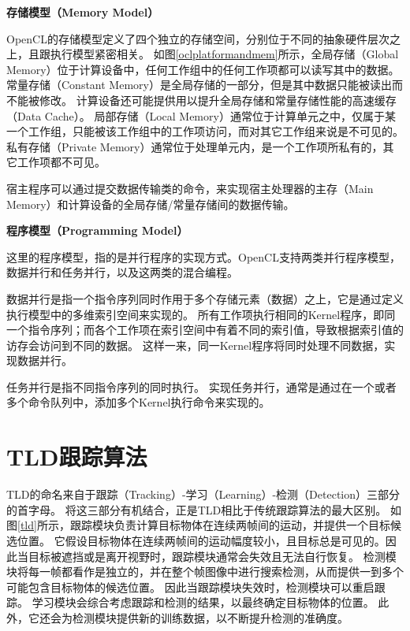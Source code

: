\begin{compactitem}
\item \textbf{存储模型（Memory Model）}
\end{compactitem}

OpenCL的存储模型定义了四个独立的存储空间，分别位于不同的抽象硬件层次之上，且跟执行模型紧密相关。
如图\ref{oclplatformandmem}所示，全局存储（Global Memory）位于计算设备中，任何工作组中的任何工作项都可以读写其中的数据。
常量存储（Constant Memory）是全局存储的一部分，但是其中数据只能被读出而不能被修改。
计算设备还可能提供用以提升全局存储和常量存储性能的高速缓存（Data Cache）。
局部存储（Local Memory）通常位于计算单元之中，仅属于某一个工作组，只能被该工作组中的工作项访问，而对其它工作组来说是不可见的。
私有存储（Private Memory）通常位于处理单元内，是一个工作项所私有的，其它工作项都不可见。

宿主程序可以通过提交数据传输类的命令，来实现宿主处理器的主存（Main Memory）和计算设备的全局存储/常量存储间的数据传输。

\begin{compactitem}
\item \textbf{程序模型（Programming Model）}
\end{compactitem}

这里的程序模型，指的是并行程序的实现方式。OpenCL支持两类并行程序模型，数据并行和任务并行，以及这两类的混合编程。

数据并行是指一个指令序列同时作用于多个存储元素（数据）之上，它是通过定义执行模型中的多维索引空间来实现的。
所有工作项执行相同的Kernel程序，即同一个指令序列；而各个工作项在索引空间中有着不同的索引值，导致根据索引值的访存会访问到不同的数据。
这样一来，同一Kernel程序将同时处理不同数据，实现数据并行。

任务并行是指不同指令序列的同时执行。
实现任务并行，通常是通过在一个或者多个命令队列中，添加多个Kernel执行命令来实现的。


\section{TLD跟踪算法}
\label{sectldalgo}
TLD的命名来自于跟踪（Tracking）-学习（Learning）-检测（Detection）三部分的首字母。
将这三部分有机结合，正是TLD相比于传统跟踪算法的最大区别。
如图\ref{tld}所示，跟踪模块负责计算目标物体在连续两帧间的运动，并提供一个目标候选位置。
它假设目标物体在连续两帧间的运动幅度较小，且目标总是可见的。因此当目标被遮挡或是离开视野时，跟踪模块通常会失效且无法自行恢复。
检测模块将每一帧都看作是独立的，并在整个帧图像中进行搜索检测，从而提供一到多个可能包含目标物体的候选位置。
因此当跟踪模块失效时，检测模块可以重启跟踪。
学习模块会综合考虑跟踪和检测的结果，以最终确定目标物体的位置。
此外，它还会为检测模块提供新的训练数据，以不断提升检测的准确度。


